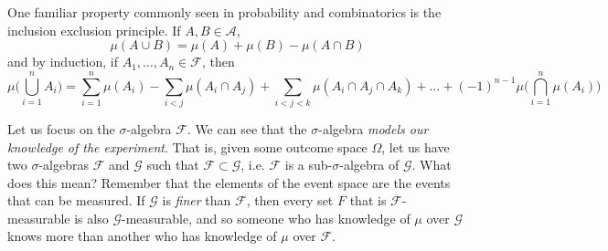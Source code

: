   \begin{theorem}
    \label{thm:inclusion-exclusion-principle}
    One familiar property commonly seen in probability and combinatorics is the inclusion exclusion principle. If $A, B \in \mathcal{A}$, 
    \begin{equation}
      \mu(A \cup B) = \mu(A) + \mu(B) - \mu(A \cap B)
    \end{equation}
    and by induction, if $A_1, \ldots, A_n \in \mathcal{F}$, then 
    \begin{equation}
      \mu\bigg( \bigcup_{i=1}^n A_i \bigg) = \sum_{i=1}^n \mu(A_i) - \sum_{i < j} \mu(A_i \cap A_j) + \sum_{i < j < k} \mu(A_i \cap A_j \cap A_k) + \ldots + (-1)^{n-1} \mu\bigg( \bigcap_{i=1}^n \mu(A_i) \bigg)
    \end{equation}
  \end{theorem}

  Let us focus on the $\sigma$-algebra $\mathcal{F}$. We can see that the $\sigma$-algebra \textit{models our knowledge of the experiment}. That is, given some outcome space $\Omega$, let us have two $\sigma$-algebras $\mathcal{F}$ and $\mathcal{G}$ such that $\mathcal{F} \subset \mathcal{G}$, i.e. $\mathcal{F}$ is a sub-$\sigma$-algebra of $\mathcal{G}$. What does this mean? Remember that the elements of the event space are the events that can be measured. If $\mathcal{G}$ is \textit{finer} than $\mathcal{F}$, then every set $F$ that is $\mathcal{F}$-measurable is also $\mathcal{G}$-measurable, and so someone who has knowledge of $\mu$ over $\mathcal{G}$ knows more than another who has knowledge of $\mu$ over $\mathcal{F}$. 

